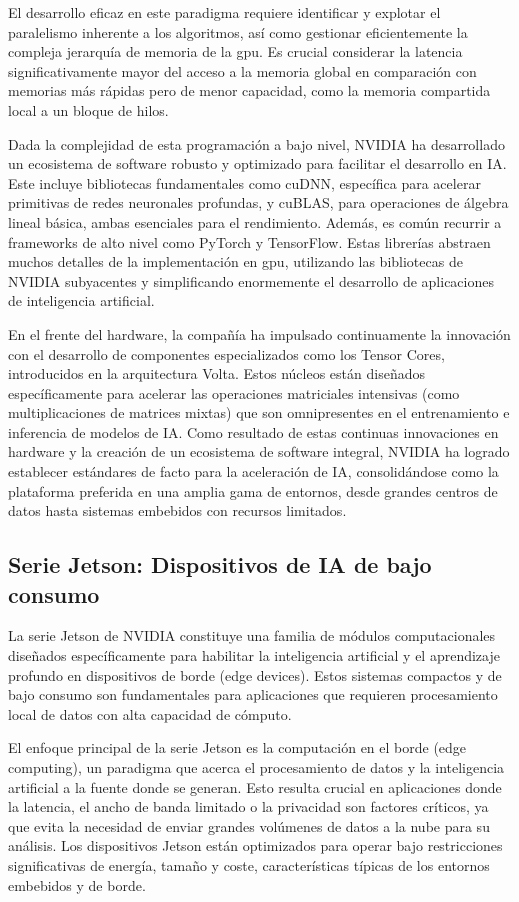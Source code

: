 \documentclass[11pt,spanish,listoffigures,listoftables]{tfgetsinf}
\begin{document}
El desarrollo eficaz en este paradigma requiere identificar y explotar el paralelismo inherente a los algoritmos, así como gestionar eficientemente la compleja jerarquía de memoria de la \gls{gpu}. Es crucial considerar la latencia significativamente mayor del acceso a la memoria global en comparación con memorias más rápidas pero de menor capacidad, como la memoria compartida local a un bloque de hilos.

Dada la complejidad de esta programación a bajo nivel, NVIDIA ha desarrollado un ecosistema de software robusto y optimizado para facilitar el desarrollo en IA. Este incluye bibliotecas fundamentales como cuDNN, específica para acelerar primitivas de redes neuronales profundas, y cuBLAS, para operaciones de álgebra lineal básica, ambas esenciales para el rendimiento. Además, es común recurrir a frameworks de alto nivel como PyTorch y TensorFlow. Estas librerías abstraen muchos detalles de la implementación en \gls{gpu}, utilizando las bibliotecas de NVIDIA subyacentes y simplificando enormemente el desarrollo de aplicaciones de inteligencia artificial.

En el frente del hardware, la compañía ha impulsado continuamente la innovación con el desarrollo de componentes especializados como los Tensor Cores, introducidos en la arquitectura Volta. Estos núcleos están diseñados específicamente para acelerar las operaciones matriciales intensivas (como multiplicaciones de matrices mixtas) que son omnipresentes en el entrenamiento e inferencia de modelos de IA. Como resultado de estas continuas innovaciones en hardware y la creación de un ecosistema de software integral, NVIDIA ha logrado establecer estándares de facto para la aceleración de IA, consolidándose como la plataforma preferida en una amplia gama de entornos, desde grandes centros de datos hasta sistemas embebidos con recursos limitados.


\subsection{Serie Jetson: Dispositivos de IA de bajo consumo} \label{sec:jetson}
La serie Jetson de NVIDIA constituye una familia de módulos computacionales diseñados específicamente para habilitar la inteligencia artificial y el aprendizaje profundo en dispositivos de borde (edge devices). Estos sistemas compactos y de bajo consumo son fundamentales para aplicaciones que requieren procesamiento local de datos con alta capacidad de cómputo.

El enfoque principal de la serie Jetson es la computación en el borde (edge computing), un paradigma que acerca el procesamiento de datos y la inteligencia artificial a la fuente donde se generan. Esto resulta crucial en aplicaciones donde la latencia, el ancho de banda limitado o la privacidad son factores críticos, ya que evita la necesidad de enviar grandes volúmenes de datos a la nube para su análisis. Los dispositivos Jetson están optimizados para operar bajo restricciones significativas de energía, tamaño y coste, características típicas de los entornos embebidos y de borde.
\end{document}
